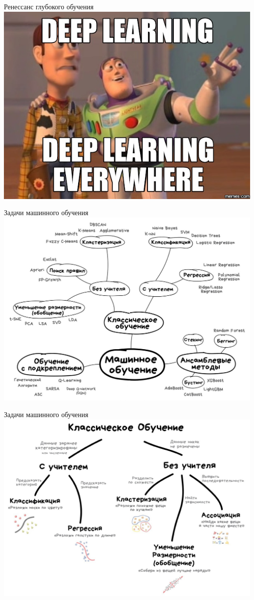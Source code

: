 \documentclass[aspectratio=169]{beamer}
\begin{document}
\begin{frame}{Ренессанс глубокого обучения}
    \centering
    \includegraphics[width=.63\linewidth]{graphs/fig30.jpg}
\end{frame}

\begin{frame}{Задачи машинного обучения}
    \centering
    \includegraphics[width=.63\linewidth]{graphs/fig31.jpg}
\end{frame}

\begin{frame}{Задачи машинного обучения}
    \centering
    \includegraphics[width=.66\linewidth]{graphs/fig32.jpg}
\end{frame}
\end{document}
